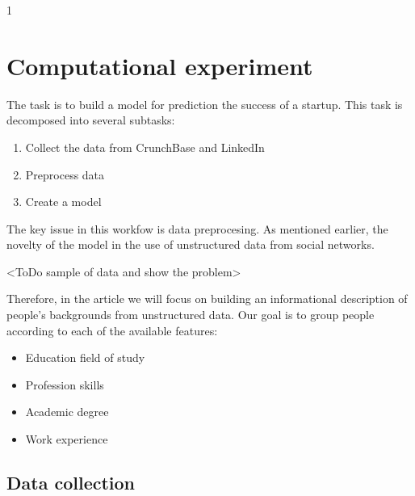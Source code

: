 \documentclass[twoside,twocolumn,12pt]{article}
\theoremstyle{plain}
\theoremstyle{definition}
\begin{document}



1

\section{Computational experiment}

The task is to build a model for prediction the success of a startup. This task is decomposed into several subtasks:

\begin{enumerate}
    \item Collect the data from CrunchBase and LinkedIn
    \item Preprocess data
    \item Create a model
\end{enumerate}

The key issue in this workfow is data preprocesing. As mentioned earlier, the novelty of the model in the use of unstructured data from social networks. 

<ToDo sample of data and show the problem>

Therefore, in the article we will focus on building an informational description of people's backgrounds from unstructured data. Our goal is to group people according to each of the available features:

\begin{itemize}
    \item Education field of study
    \item Profession skills
    \item Academic degree
    \item Work experience
\end{itemize}

\subsection{Data collection}
\end{document}
